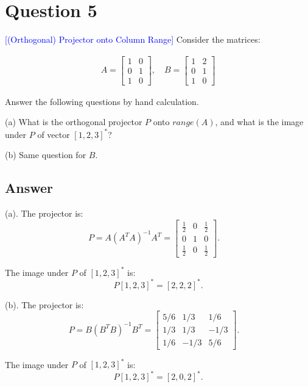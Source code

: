 \section*{Question 5}
\textcolor{blue}{[(Orthogonal) Projector onto Column Range]} Consider the matrices:

\begin{align*}
    A = \begin{bmatrix}
        1 & 0\\ 0 & 1\\ 1 & 0
    \end{bmatrix},\quad
    B = \begin{bmatrix}
        1 & 2\\ 0 & 1\\ 1 & 0
        \end{bmatrix}
    \end{align*}

Answer the following questions by hand calculation.

(a) What is the orthogonal projector $P$ onto $range(A)$,
and what is the image under $P$ of vector $[1,2,3]^*$?

(b) Same question for $B$.

\subsection*{Answer}

(a). The projector is: \begin{equation*}
    P = A(A^TA)^{-1}A^T = 
    \begin{bmatrix}
        \frac{1}{2} & 0 & \frac{1}{2} 
        \\ 0 & 1 & 0
        \\ \frac{1}{2} & 0 & \frac{1}{2}
    \end{bmatrix}.\quad
\end{equation*}

The image under $P$ of $[1,2,3]^*$ is:
\begin{equation*}
    P[1, 2, 3]^* = [2, 2, 2]^*.    
\end{equation*}

(b). The projector is: \begin{equation*}
    P = B(B^TB)^{-1}B^T = 
    \begin{bmatrix}
        5/6 & 1/3 & 1/6 
        \\ 1/3 & 1/3 & -1/3
        \\ 1/6 & -1/3 & 5/6
    \end{bmatrix}.\quad
\end{equation*}

The image under $P$ of $[1,2,3]^*$ is:
\begin{equation*}
    P[1, 2, 3]^* = [2, 0, 2]^*.    
\end{equation*}





